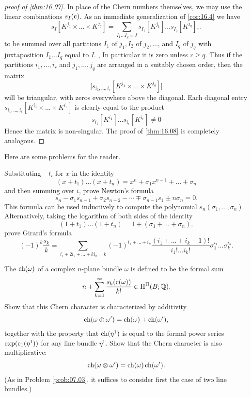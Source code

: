 \documentclass[../main]{subfiles}
\begin{document}
\begin{proof}[proof of \ref{thm:16.07}]
In place of the Chern numbers themselves, we may use the linear combinations $s_{I}(\operatorname{c})$. As an immediate generalization of \ref{cor:16.4} we have
\[
s_{I}[K^{j_{1}} \times \ldots \times K^{j_{q}}]=\sum_{I_{1} \ldots I_{q}=I} s_{I_{1}}[K^{j_{1}}] \ldots s_{I_{q}}[K^{j_{q}}],.
\]
to be summed over all partitions $I_{1}$ of $j_{1}, I_{2}$ of $j_{2}, \ldots$, and $I_{q}$ of $j_{q}$ with juxtaposition $I_{1} \ldots I_{q}$ equal to $I$. , In particular it is zero unless $r \geq q$. Thus if the partitions $i_{1}, \ldots, i_{r}$ and $j_{1}, \ldots, j_{q}$ are arranged in a suitably chosen order, then the matrix
\[
\Big[s_{i_{1}, \ldots, i_{r}}[K^{j_{1}} \times \ldots \times K^{j_{q}}]\Big]
\]
will be triangular, with zeros everywhere above the diagonal. Each diagonal entry $s_{i_{1}, \ldots, i_{r}}[K^{i_{1}} \times \ldots \times K^{i_r}]$ is clearly equal to the product
\[
s_{i_{1}}[K^{i_{1}}] \ldots s_{i_{r}}[K^{i_r}] \neq 0
\]
Hence the matrix is non-singular. The proof of \ref{thm:16.08} is completely analogous.\end{proof}

Here are some problems for the reader.

\begin{problem}\label{prob:16.A}
Substituting $-t_{i}$ for $x$ in the identity \[(x+t_{1}) \ldots(x+t_{n})=x^{n}+\sigma_{1} x^{n-1}+\ldots+\sigma_{n}\] and then summing over $i$, prove Newton's formula
\[
s_{n}-\sigma_{1} s_{n-1}+\sigma_{2} s_{n-2}-\cdots \mp \sigma_{n-1} s_{1} \pm n \sigma_{n}=0 .
\]
This formula can be used inductively to compute the polynomial $s_{n}(\sigma_{1}, \ldots, \sigma_{n})$. Alternatively, taking the logarithm of both sides of the identity \[(1+t_{1}) \ldots(1+t_{n})=1+(\sigma_{1}+\ldots+\sigma_{n}),\] prove Girard's formula
\[
(-1)^{k} \dfrac{s_k}{k}=\sum_{i_{1}+2 i_{2}+\ldots+ki_{k}=k}(-1)^{i_{1}+\ldots+i_{k}} \frac{(i_{1}+\ldots+i_{k}-1) !}{i_{1} ! \ldots i_{k} !} \sigma_{1}^{i_{1}} \ldots \sigma_{k}^{i_{k}} .
\]
\end{problem}

\begin{problem}\label{prob:16.B}
The  $\operatorname{ch}(\omega)$ of a complex $n$-plane bundle $\omega$ is defined to be the formal sum
\[
n+\sum_{k=1}^{\infty} \dfrac{s_{k}(\operatorname{c}(\omega)) }{k!} \in \operatorname{H}^{\Pi}(B ; \mathbb{Q}) .
\]
Show that this Chern character is characterized by additivity
\[
\operatorname{ch}(\omega \oplus \omega^{\prime})=\operatorname{ch}(\omega)+\operatorname{ch}(\omega^{\prime}),
\]
together with the property that $\operatorname{ch}(\eta^{1})$ is equal to the formal power series $\exp (\operatorname{c}_{1}(\eta^{1}))$ for any line bundle $\eta^{1}$. Show that the Chern character is also multiplicative:
\[
\operatorname{ch}(\omega \otimes \omega^{\prime})=\operatorname{ch}(\omega) \operatorname{ch}(\omega^{\prime}) .
\]
(As in Problem \ref{prob:07.03}, it suffices to consider first the case of two line bundles.)
\end{problem}
\end{document}
